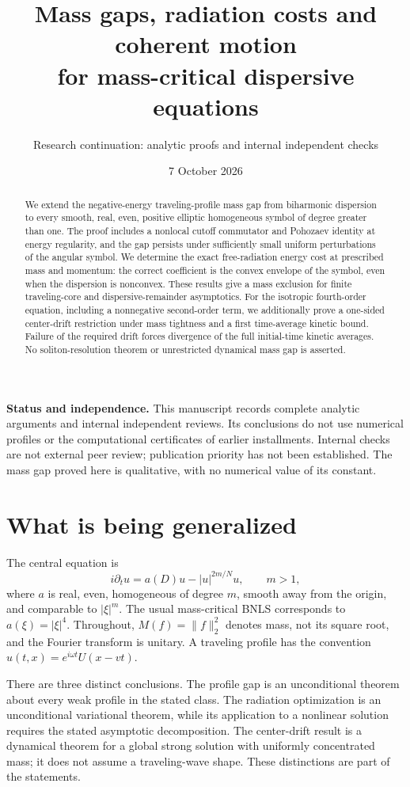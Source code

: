 \documentclass[11pt,a4paper]{article}
\title{Mass gaps, radiation costs and coherent motion\\for mass-critical dispersive equations}
\author{Research continuation: analytic proofs and internal independent checks}
\date{7 October 2026}
\theoremstyle{remark}\newtheorem{remark}[theorem]{Remark}
\begin{document}
\maketitle
\begin{abstract}
We extend the negative-energy traveling-profile mass gap from biharmonic dispersion to every smooth, real, even, positive elliptic homogeneous symbol of degree greater than one. The proof includes a nonlocal cutoff commutator and Pohozaev identity at energy regularity, and the gap persists under sufficiently small uniform perturbations of the angular symbol. We determine the exact free-radiation energy cost at prescribed mass and momentum: the correct coefficient is the convex envelope of the symbol, even when the dispersion is nonconvex. These results give a mass exclusion for finite traveling-core and dispersive-remainder asymptotics. For the isotropic fourth-order equation, including a nonnegative second-order term, we additionally prove a one-sided center-drift restriction under mass tightness and a first time-average kinetic bound. Failure of the required drift forces divergence of the full initial-time kinetic averages. No soliton-resolution theorem or unrestricted dynamical mass gap is asserted.
\end{abstract}
\noindent\textbf{Status and independence.} This manuscript records complete analytic arguments and internal independent reviews. Its conclusions do not use numerical profiles or the computational certificates of earlier installments. Internal checks are not external peer review; publication priority has not been established. The mass gap proved here is qualitative, with no numerical value of its constant.

\section*{What is being generalized}
The central equation is
\[
 i\partial_t u=a(D)u-|u|^{2m/N}u,\qquad m>1,
\]
where $a$ is real, even, homogeneous of degree $m$, smooth away from the origin, and comparable to $|\xi|^m$. The usual mass-critical BNLS corresponds to $a(\xi)=|\xi|^4$. Throughout, $M(f)=\|f\|_2^2$ denotes mass, not its square root, and the Fourier transform is unitary. A traveling profile has the convention $u(t,x)=e^{i\omega t}U(x-vt)$.

There are three distinct conclusions. The profile gap is an unconditional theorem about every weak profile in the stated class. The radiation optimization is an unconditional variational theorem, while its application to a nonlinear solution requires the stated asymptotic decomposition. The center-drift result is a dynamical theorem for a global strong solution with uniformly concentrated mass; it does not assume a traveling-wave shape. These distinctions are part of the statements.
\end{document}
